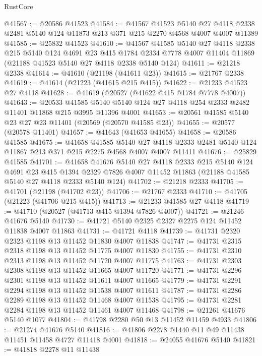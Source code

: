 \begin{lexlean}{RustCore}
\begin{coremodule}
@41567 := @20586 @41523
@41584 := @41567
    @41523
    @5140
    @27
    @4118
    @2338
    @2481
    @5140
    @124
    @11873
    @213
    @371
    @215
    @2270
    @4568
    @4007
    @4007
    @11389
@41585 := @25832 @41523
@41610 := @41567
    @41585
    @5140
    @27
    @4118
    @2338
    @215
    @5140
    @124
    @4691
    @23
    @415
    @1784
    @2334
    @7778
    @4007
    @11404
    @11869
    (@21188 @41523 @5140 @27 @4118 @2338 @5140 @124)
@41611 := @21218 @2338
@41614 := @41610 (@21198 (@41611 @23))
@41615 := @21767 @2338
@41619 := @41614 (@21223 (@41615 @215 @415))
@41622 := @21233 @41523 @27 @4118
@41628 := @41619 (@20527 (@41622 @415 @1784 @7778 @4007))
@41643 := @20533
    @41585
    @5140
    @5140
    @124
    @27
    @4118
    @254
    @2333
    @2482
    @11401
    @11868
    @215
    @3995
    @11396
    @4001
@41653 := @20561 @41585 @5140 @23 @27 @23 @11401 (@20569 (@20570 @41585 @23))
@41655 := @20577 (@20578 @11401)
@41657 := @41643 (@41653 @41655)
@41658 := @20586 @41585
@41675 := @41658
    @41585
    @5140
    @27
    @4118
    @2333
    @2481
    @5140
    @124
    @11867
    @213
    @371
    @215
    @2275
    @4568
    @4007
    @4007
    @11411
@41676 := @25829 @41585
@41701 := @41658
    @41676
    @5140
    @27
    @4118
    @2333
    @215
    @5140
    @124
    @4691
    @23
    @415
    @1394
    @2329
    @7826
    @4007
    @11452
    @11863
    (@21188 @41585 @5140 @27 @4118 @2333 @5140 @124)
@41702 := @21218 @2333
@41705 := @41701 (@21198 (@41702 @23))
@41706 := @21767 @2333
@41710 := @41705 (@21223 (@41706 @215 @415))
@41713 := @21233 @41585 @27 @4118
@41719 := @41710 (@20527 (@41713 @415 @1394 @7826 @4007))
@41721 := @21246 @41676 @5140
@41730 := @41721 @5140 @2325 @2327 @2275 @124 @11452 @11838 @4007 @11863
@41731 := @41721 @4118
@41739 := @41731 @2320 @2323 @1198 @13 @11452 @11830 @4007 @11838
@41747 := @41731 @2315 @2318 @1198 @13 @11452 @11775 @4007 @11830
@41755 := @41731 @2310 @2313 @1198 @13 @11452 @11720 @4007 @11775
@41763 := @41731 @2303 @2308 @1198 @13 @11452 @11665 @4007 @11720
@41771 := @41731 @2296 @2301 @1198 @13 @11452 @11611 @4007 @11665
@41779 := @41731 @2291 @2294 @1198 @13 @11452 @11538 @4007 @11611
@41787 := @41731 @2286 @2289 @1198 @13 @11452 @11468 @4007 @11538
@41795 := @41731 @2281 @2284 @1198 @13 @11452 @11461 @4007 @11468
@41798 := @21261 @41676 @5140 @1077
@41804 := @41798 @2280 @50 @13 @11452 @11459 @4933
@41806 := @21274 @41676 @5140
@41816 := @41806 @2278 @1440 @11 @49 @11438 @11451 @11458 @4727 @11418 @4001
@41818 := @24055 @41676 @5140
@41821 := @41818 @2278 @11 @11438

\end{coremodule}
\end{lexlean}
